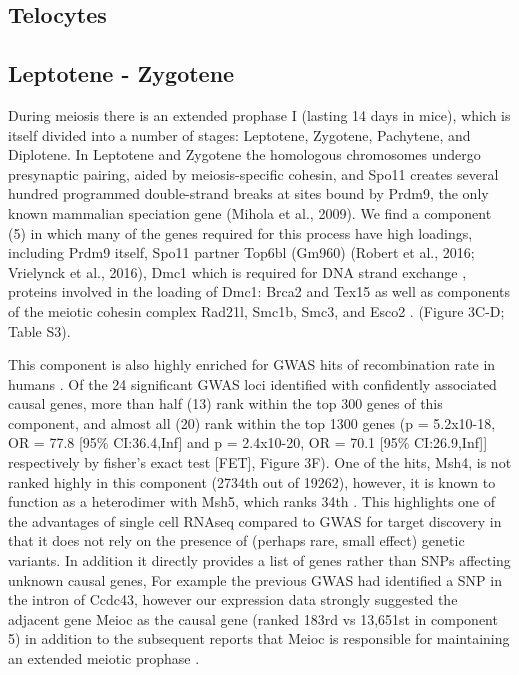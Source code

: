 \subsection{Telocytes}

\subsection{Leptotene - Zygotene}

During meiosis there is an extended prophase I (lasting 14 days in mice), which is itself divided into a number of stages: Leptotene, Zygotene, Pachytene, and Diplotene. In Leptotene and Zygotene the homologous chromosomes undergo presynaptic pairing, aided by meiosis-specific cohesin, and Spo11 creates several hundred programmed double-strand breaks at sites bound by Prdm9, the only known mammalian speciation gene (Mihola et al., 2009). We find a component (5) in which many of the genes required for this process have high loadings, including Prdm9 itself, Spo11 partner Top6bl (Gm960) (Robert et al., 2016; Vrielynck et al., 2016), Dmc1 which is required for DNA strand exchange \cite{Brown2014DNA}, proteins involved in the loading of Dmc1: Brca2 \cite{Martinez2016BRCA2} and Tex15 \cite{Yang2008Mouse} as well as  components of the meiotic cohesin complex Rad21l, Smc1b, Smc3, and Esco2 \cite{Rankin2015Complex}. (Figure 3C-D; Table S3).

This component is also highly enriched for GWAS hits of recombination rate in humans \cite{Halldorsson2019Characterizing}. Of the 24 significant GWAS loci identified with confidently associated causal genes, more than half (13) rank within the top 300 genes of this component, and almost all (20) rank within the top 1300 genes (p = 5.2x10-18, OR = 77.8 [95\% CI:36.4,Inf] and p = 2.4x10-20, OR = 70.1 [95\% CI:26.9,Inf]] respectively by fisher's exact test [FET], Figure 3F). One of the hits, Msh4, is not ranked highly in this component (2734th out of 19262), however, it is known to function as a heterodimer with Msh5, which ranks 34th \cite{Rakshambikai2013Structural}. This highlights one of the advantages of single cell RNAseq compared to GWAS for target discovery in that it does not rely on the presence of (perhaps rare, small effect) genetic variants. In addition it directly provides a list of genes rather than SNPs affecting unknown causal genes, For example the previous GWAS had identified a SNP in the intron of Ccdc43, however our expression data strongly suggested the adjacent gene Meioc as the causal gene (ranked 183rd vs 13,651st in component 5) in addition to the subsequent reports that Meioc is responsible for maintaining an extended meiotic prophase \cite{Abby2016Implementation, Kong2014Common, Soh2017Meioc}. 

